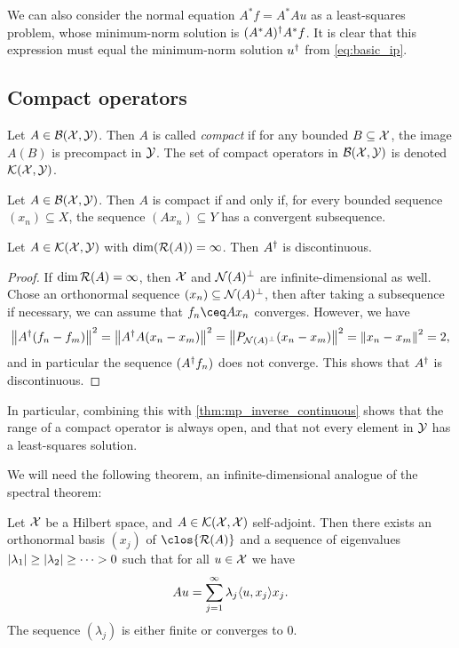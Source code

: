 \begin{remark}
    We can also consider the normal equation $A^* f = A^* A u$ as a least-squares problem, whose minimum-norm solution is $(A^* A)^\dagger A^* f$. It is clear that this expression must equal the minimum-norm solution $u^\dagger$ from \cref{eq:basic_ip}. 
\end{remark}

\subsection{Compact operators}
\begin{definition}
    Let $A \in \mathcal B(\mathcal X, \mathcal Y)$. Then $A$ is called \emph{compact} if for any bounded $B \subseteq \mathcal X$, the image $A(B)$ is precompact in $\mathcal Y$. The set of compact operators in $\mathcal B(\mathcal X, \mathcal Y)$ is denoted $\mathcal K(\mathcal X, \mathcal Y)$. 
\end{definition}

\begin{lemma}
    Let $A \in \mathcal B(\mathcal X, \mathcal Y)$. Then $A$ is compact if and only if, for every bounded sequence $(x_n) \subseteq X$, the sequence $(Ax_n) \subseteq Y$ has a convergent subsequence. 
\end{lemma}

\begin{theorem}
    Let $A \in \mathcal K(\mathcal X, \mathcal Y)$ with $\dim(\operatorname{\mathcal R}(A)) = \infty$. Then $A^\dagger$ is discontinuous. 
\end{theorem}

\begin{proof}
    If $\dim\operatorname{\mathcal R}(A) = \infty$, then $\mathcal X$ and $\operatorname{\mathcal N}(A)^\perp$ are infinite-dimensional as well. Chose an orthonormal sequence $(x_n) \subseteq \operatorname{\mathcal N}(A)^\perp$, then after taking a subsequence if necessary, we can assume that $f_n \ceq Ax_n$ converges. However, we have
    \[
    \norm{A^\dagger(f_n - f_m)}^2 = \norm{A^\dagger A (x_n - x_m)}^2 = \norm{P_{\operatorname{\mathcal N}(A)^\perp} (x_n - x_m)}^2 = \norm{x_n -x_m}^2 = 2, 
    \]
    and in particular the sequence $(A^\dagger f_n)$ does not converge. This shows that $A^\dagger$ is discontinuous. 
\end{proof}

In particular, combining this with \cref{thm:mp_inverse_continuous} shows that the range of a compact operator is always open, and that not every element in $\mathcal Y$ has a least-squares solution. 

We will need the following theorem, an infinite-dimensional analogue of the spectral theorem: 
\begin{theorem} Let $\mathcal X$ be a Hilbert space, and $A \in \mathcal K(\mathcal X, \mathcal X)$ self-adjoint. Then there exists an orthonormal basis $(x_j)$ of $
   \clos{\Ran(A)}$ and a sequence of eigenvalues $\abs{\lambda_1} \geq \abs{\lambda_2} \geq \dotsb > 0$ such that for all $u \in \mathcal X$ we have
    \[
    Au = \sum_{j=1}^\infty \lambda_j \langle u, x_j\rangle x_j. 
    \]
The sequence $(\lambda_j)$ is either finite or converges to 0. 
\end{theorem}

